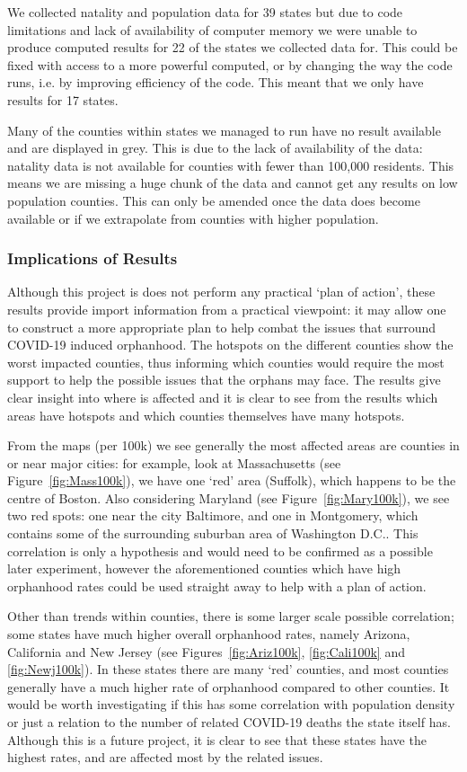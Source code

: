 \documentclass[11pt]{article}
\begin{document}
We collected natality and population data for 39 states but due to code limitations and lack of availability of computer memory we were unable to produce computed results for 22 of the states we collected data for. This could be fixed with access to a more powerful computed, or by changing the way the code runs, i.e. by improving efficiency of the code. This meant that we only have results for 17 states.

Many of the counties within states we managed to run have no result available and are displayed in grey. This is due to the lack of availability of the data: natality data is not available for counties with fewer than 100,000 residents. This means we are missing a huge chunk of the data and cannot get any results on low population counties. This can only be amended once the data does become available or if we extrapolate from counties with higher population.

\subsubsection{Implications of Results}
Although this project is does not perform any practical ‘plan of action’, these results provide import information from a practical viewpoint: it may allow one to construct a more appropriate plan to help combat the issues that surround COVID-19 induced orphanhood. The hotspots on the different counties show the worst impacted counties, thus informing which counties would require the most support to help the possible issues that the orphans may face. The results give clear insight into where is affected and it is clear to see from the results which areas have hotspots and which counties themselves have many hotspots.

From the maps (per 100k) we see generally the most affected areas are counties in or near major cities: for example, look at Massachusetts (see Figure~\ref{fig:Mass100k}), we have one ‘red’ area (Suffolk), which happens to be the centre of Boston. Also considering Maryland (see Figure~\ref{fig:Mary100k}), we see two red spots: one near the city Baltimore, and one in Montgomery, which contains some of the surrounding suburban area of Washington D.C.. This correlation is only a hypothesis and would need to be confirmed as a possible later experiment, however the aforementioned counties which have high orphanhood rates could be used straight away to help with a plan of action. 

Other than trends within counties, there is some larger scale possible correlation; some states have much higher overall orphanhood rates, namely Arizona, California and New Jersey (see Figures~\ref{fig:Ariz100k}, \ref{fig:Cali100k} and \ref{fig:Newj100k}). In these states there are many ‘red’ counties, and most counties generally have a much higher rate of orphanhood compared to other counties. It would be worth investigating if this has some correlation with population density or just a relation to the number of related COVID-19 deaths the state itself has. Although this is a future project, it is clear to see that these states have the highest rates, and are affected most by the related issues.  
\end{document}
